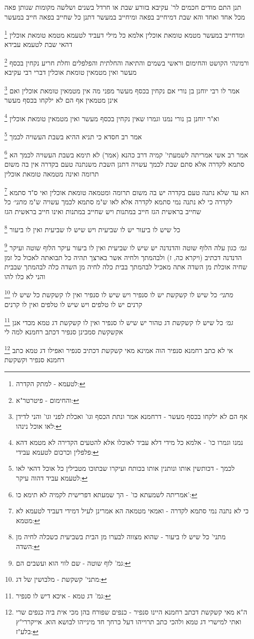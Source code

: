 \documentclass[12pt, openany]{book}
\newcommand{\footnotecomment}[1]{
	\renewcommand\thefootnote{}
	\footnote{#1}}
\newcommand{\commenta}[1]{\footnotecomment{#1}}
\begin{document}
{תנן התם מודים חכמים לר' עקיבא בזורע שבת או חרדל בשנים ושלשה מקומות שנותן פאה מכל אחד ואחד
והא שבת דמיחייב בפאה ומיחייב במעשר דתנן כל שחייב בפאה חייב במעשר 
\commenta{לטעמא - למתק הקדרה:}
ומדחייב במעשר מטמא טומאת אוכלין אלמא כל מילי דעביד לטעמא מטמא טומאת אוכלין דהאי שבת לטעמא עבידא 
\commenta{והחימום - פיטרטר"א:}
ורמינהי הקושט והחימום וראשי בשמים והתיאה והחלתית והפלפלים וחלת חריע נקחין בכסף מעשר ואין מטמאין טומאת אוכלין דברי רבי עקיבא 
\commenta{אף הם לא ילקחו בכסף מעשר - דרחמנא אמר ונתת הכסף וגו' ואכלת לפני וגו' והני לדידן לאו אוכל נינהו:}
אמר לו רבי יוחנן בן נורי אם נקחין בכסף מעשר מפני מה אין מטמאין טומאת אוכלין ואם אינן מטמאין אף הם לא ילקחו בכסף מעשר 
\commenta{נמנו וגמרו כו' - אלמא כל מידי דלא עביד לאוכלו אלא להטעים הקדירה לא מטמא דהא פלפלין וכרכום לטעמא עבידי:}
וא"ר יוחנן בן נורי נמנו וגמרו שאין נקחין בכסף מעשר ואין מטמאין טומאת אוכלין 
\commenta{לכמך - דכותשין אותו ונותנין אותו בכותח ועיקרו שבתוכו מטבילין כל אוכל דהאי לאו לטעמא עביד דהוה עיקר:}
אמר רב חסדא כי תניא ההיא בשבת העשויה לכמך 
\commenta{אמריתה לשמעתא כו' - הך שמעתא דפרישית לקמיה לא תימא כו':}
אמר רב אשי אמריתה לשמעתי' קמיה דרב כהנא (אמר) לא תימא בשבת העשויה לכמך הא סתמא לקדרה אלא סתם שבת לכמך עשויה דתנן השבת משנתנה טעם בקדרה אין בה משום תרומה ואינה מטמאה טומאת אוכלין 
\commenta{כי לא נתנה נמי סתמא לקדרה - ואמאי מטמאה הא אמרינן לעיל דמידי דעביד לטעמא לא מטמא:}
הא עד שלא נתנה טעם בקדרה יש בה משום תרומה ומטמאה טומאת אוכלין ואי ס"ד סתמא לקדרה כי לא נתנה נמי סתמא לקדרה אלא לאו ש"מ סתמא לכמך עשויה ש"מ
{\large\emph{מתני׳}} כל שחייב בראשית הגז חייב במתנות ויש שחייב במתנות ואינו חייב בראשית הגז
\commenta{מתני' כל שיש לו ביעור - שהוא מצווה לבערו מן הבית בשביעית כשכלה לחיה מן השדה:}
כל שיש לו ביעור יש לו שביעית ויש שיש לו שביעית ואין לו ביעור
\commenta{גמ' לוף שוטה - שם לווי הוא ועשבים הם:}
{\large\emph{גמ׳}} כגון עלה הלוף שוטה והדנדנה יש שיש לו שביעית ואין לו ביעור עיקר הלוף שוטה ועיקר הדנדנה
דכתיב (ויקרא כה, ז) ולבהמתך ולחיה אשר בארצך תהיה כל תבואתה לאכול כל זמן שחיה אוכלת מן השדה אתה מאכיל לבהמתך בבית כלה לחיה מן השדה כלה לבהמתך שבבית והני לא כלו להו
\commenta{מתני' קשקשת - מלבושין של דג:}
{\large\emph{מתני׳}} כל שיש לו קשקשת יש לו סנפיר ויש שיש לו סנפיר ואין לו קשקשת כל שיש לו קרנים יש לו טלפים ויש שיש לו טלפים ואין לו קרנים
\commenta{גמ' דג טמא - איכא דיש לו סנפיר:}
{\large\emph{גמ׳}} כל שיש לו קשקשת דג טהור יש שיש לו סנפיר ואין לו קשקשת דג טמא מכדי אנן אקשקשת סמכינן סנפיר דכתב רחמנא למה לי 
\commenta{ה"א מאי קשקשת דכתב רחמנא היינו סנפיר - כנפים שפורח בהן מכי אית ביה כנפים שרי ואתי למישרי דג טמא ולהכי כתב תרוייהו דעל כרחך חד מינייהו לבושא הוא. אייקררי"ץ בלע"ז:}
אי לא כתב רחמנא סנפיר הוה אמינא מאי קשקשת דכתיב סנפיר ואפילו דג טמא כתב רחמנא סנפיר וקשקשת 
}
\end{document}
